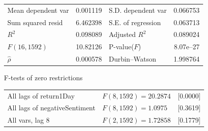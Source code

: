 \begin{center}
\begin{tabular}{lrlr}
Mean dependent var &  0.001119 & S.D. dependent var &  0.066753 \\
Sum squared resid &  6.462398 & S.E. of regression &  0.063713 \\
$R^2$ &  0.098089 & Adjusted $R^2$ &  0.089024 \\
$F(16, 1592)$ &  10.82126 & P-value($F$) &  8.07\textrm{e--27} \\
$\hat{\rho}$ &  0.000578 & Durbin--Watson &  1.998764 \\
\end{tabular}

\end{center}

\begin{center}
F-tests of zero restrictions\\[1em]
\begin{tabular}{lll}
All lags of return1Day & $F(8, 1592) = 20.2874$ & [0.0000]\\
All lags of negativeSentiment & $F(8, 1592) = 1.0975$ & [0.3619]\\
All vars, lag 8 & $F(2, 1592) = 1.72858$ & [0.1779]\\
\end{tabular}
\end{center}

